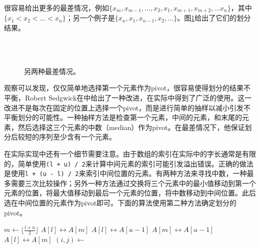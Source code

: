 \documentclass[UTF8]{article}
\begin{document}
很容易给出更多的最差情况，例如$\{ x_m, x_{m-1}, ..., x_2, x_1, x_{m+1}, x_{m+2}, ... x_n\}$，其中$\{ x_1 < x_2 < ... < x_n \}$；另一个例子是$\{x_n, x_1, x_{n-1}, x_2, ... \}$。图\ref{fig:worst-cases-2}给出了它们的划分结果。

\begin{figure}[htbp]
   \centering
    \\
    \\
   \caption{另两种最差情况。}
   \label{fig:worst-cases-2}
\end{figure}

观察可以发现，仅仅简单地选择第一个元素作为pivot，很容易使得划分的结果不平衡，Robert Sedgwick在\cite{qsort-impl}中给出了一种改进，在实际中得到了广泛的使用。这一改进不是每次在固定的位置上选择一个pivot，而是进行简单的抽样以减小引发不平衡划分的可能性。一种抽样方法是检查第一个元素，中间的元素，和末尾的元素，然后选择这三个元素的中数（median）作为pivot。在最差情况下，他保证划分后较短的序列至少含有一个元素。

在实际实现中还有一个细节需要注意。由于数组的索引在实际中的字长通常是有限的，简单使用\texttt{(l + u) / 2}来计算中间元素的索引可能引发溢出错误。正确的做法是使用\texttt{l + (u - l) / 2}来索引中间位置的元素。有两种方法来寻找中数，一种最多需要三次比较操作\cite{3-way-part}；另外一种方法通过交换将三个元素中的最小值移动到第一个元素的位置，将最大值移动到最后一个元素的位置，将中数移动到中间位置。此后选在中间位置的元素作为pivot即可。下面的算法使用第二种方法确定划分的pivot。

\begin{algorithmic}[1]
    \State $m \gets \lfloor \frac{l + u}{2} \rfloor$ 
     
      \State {} $A[l] \leftrightarrow A[m]$
    \EndIf
     
      \State {} $A[l] \leftrightarrow A[u-1]$
    \EndIf
     
      \State {} $A[m] \leftrightarrow A[u-1]$
    \EndIf
    \State {} $A[l] \leftrightarrow A[m]$
    \State $(i, j) \gets $ 
    \State {}
    \State {}
  \EndIf
\EndProcedure
\end{algorithmic}
\end{document}
